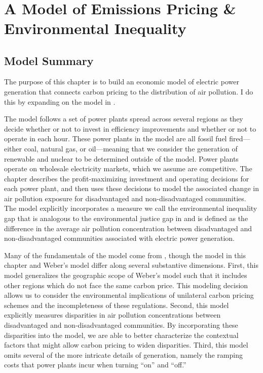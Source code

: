 ~
\newpage
\section{A Model of Emissions Pricing \& Environmental Inequality}

\subsection{Model Summary}

The purpose of this chapter is to build an economic model of electric power generation that connects carbon pricing to the distribution of air pollution. I do this by expanding on the model in \cite{weber2021dynamic}. 

The model follows a set of power plants spread across several regions as they decide whether or not to invest in efficiency improvements and whether or not to operate in each hour. These power plants in the model are all fossil fuel fired---either coal, natural gas, or oil---meaning that we consider the generation of renewable and nuclear to be determined outside of the model. Power plants operate on wholesale electricity markets, which we assume are competitive. The chapter describes the profit-maximizing investment and operating decisions for each power plant, and then uses these decisions to model the associated change in air pollution exposure for disadvantaged and non-disadvantaged communities. The model explicitly incorporates a measure we call the environmental inequality gap that is analogous to the environmental justice gap in \cite{hernandez2023environmental} and is defined as the difference in the average air pollution concentration between disadvantaged and non-disadvantaged communities associated with electric power generation.  

Many of the fundamentals of the model come from \cite{weber2021dynamic}, though the model in this chapter and Weber's model differ along several substantive dimensions. First, this model generalizes the geographic scope of Weber's model such that it includes other regions which do not face the same carbon price. This modeling decision allows us to consider the environmental implications of unilateral carbon pricing schemes and the incompleteness of these regulations. Second, this model explicitly measures disparities in air pollution concentrations between disadvantaged and non-disadvantaged communities. By incorporating these disparities into the model, we are able to better characterize the contextual factors that might allow carbon pricing to widen disparities. Third, this model omits several of the more intricate details of generation, namely the ramping costs that power plants incur when turning ``on'' and ``off.''

